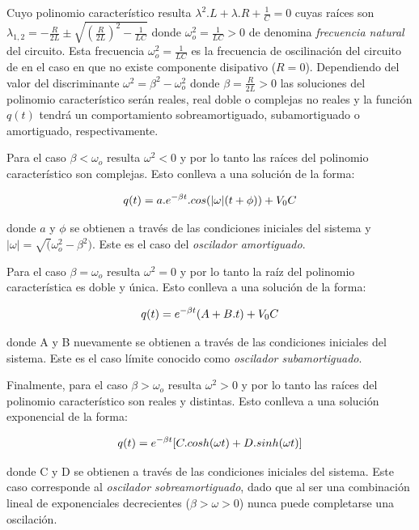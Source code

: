 \documentclass[11pt,a4paper]{article}
\begin{document}
Cuyo polinomio característico resulta $\lambda^2.L+\lambda.R+\frac{1}{C} = 0$ cuyas raíces son $\lambda_{1,2} = -\frac{R}{2L} \pm \sqrt{(\frac{R}{2L})^2-\frac{1}{LC}}$ donde $\omega_o^2 = \frac{1}{LC}>0$ de denomina \textit{frecuencia natural} del circuito. Esta frecuencia $\omega_o^2 = \frac{1}{LC}$ es la frecuencia de oscilinación del circuito de en el caso en que no existe componente disipativo ($R=0$). Dependiendo del valor del discriminante $\omega^2 = \beta^2-\omega_o^2$ donde $\beta = \frac{R}{2L}>0$ las soluciones del polinomio característico serán reales, real doble o complejas no reales y la función $q(t)$ tendrá un comportamiento sobreamortiguado, subamortiguado o amortiguado, respectivamente. 

Para el caso $\beta < \omega_o$ resulta $\omega^2 < 0$ y por lo tanto las raíces del polinomio característico son complejas. Esto conlleva a una solución de la forma:

\begin{equation}{\label{amort}}
q(t) = a.e^{-\beta t}.cos(|\omega|(t+\phi)) + V_0C
\end{equation}

donde $a$ y $\phi$ se obtienen a través de las condiciones iniciales del sistema y $|\omega| = \sqrt(\omega_o^2-\beta^2)$. Este es el caso del \textit{oscilador amortiguado}.

Para el caso $\beta = \omega_o$ resulta $\omega^2 = 0$ y por lo tanto la raíz del polinomio característica es doble y única. Esto conlleva a una solución de la forma:

\begin{equation}{\label{sub}}
q(t) = e^{-\beta t}(A+B.t) + V_0C
\end{equation}

donde A y B nuevamente se obtienen a través de las condiciones iniciales del sistema. Este es el caso límite conocido como \textit{oscilador subamortiguado}.

Finalmente, para el caso $\beta > \omega_o$ resulta $\omega^2>0$ y por lo tanto las raíces del polinomio característico son reales y distintas. Esto conlleva a una solución exponencial de la forma:

\begin{equation}{\label{sobre}}
q(t) = e^{-\beta t}[C.cosh(\omega t)+D.sinh(\omega t)]
\end{equation}

donde C y D se obtienen a través de las condiciones iniciales del sistema. Este caso corresponde al \textit{oscilador sobreamortiguado}, dado que al ser una combinación lineal de exponenciales decrecientes ($\beta > \omega > 0$) nunca puede completarse una oscilación. 
\end{document}

